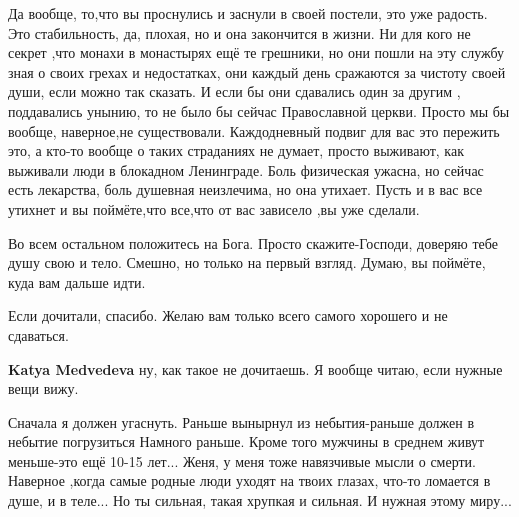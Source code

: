 \begin{itemize}
Да вообще, то,что вы проснулись и заснули в своей постели, это уже радость. Это
стабильность, да, плохая, но и она закончится в жизни. Ни для кого не секрет
,что монахи в монастырях ещё те грешники, но они пошли на эту службу зная о
своих грехах и недостатках, они каждый день сражаются за чистоту своей души,
если можно так сказать. И если бы они сдавались один за другим , поддавались
унынию, то не было бы сейчас Православной церкви. Просто мы бы вообще,
наверное,не существовали. Каждодневный подвиг для вас это пережить это, а
кто-то вообще о таких страданиях не думает, просто выживают, как выживали люди
в блокадном Ленинграде. Боль физическая ужасна, но сейчас есть лекарства, боль
душевная неизлечима, но она утихает. Пусть и в вас все утихнет и вы поймёте,что
все,что от вас зависело ,вы уже сделали. 

Во всем остальном положитесь на Бога.  Просто скажите-Господи, доверяю тебе
душу свою и тело. Смешно, но только на первый взгляд. Думаю, вы поймёте, куда
вам дальше идти.

Если дочитали, спасибо. Желаю вам только всего самого хорошего и не сдаваться.

\begin{itemize}
 
\textbf{Katya Medvedeva} ну, как такое не дочитаешь. Я вообще читаю, если нужные вещи вижу.
\end{itemize}

 

Сначала я должен угаснуть. Раньше вынырнул из небытия-раньше должен в небытие
погрузиться Намного раньше. Кроме того мужчины в среднем живут меньше-это ещё
10-15 лет... Женя, у меня тоже навязчивые мысли о смерти. Наверное ,когда самые
родные люди уходят на твоих глазах, что-то ломается в душе, и в теле... Но ты
сильная, такая хрупкая и сильная. И нужная этому миру...


 

\end{itemize}
